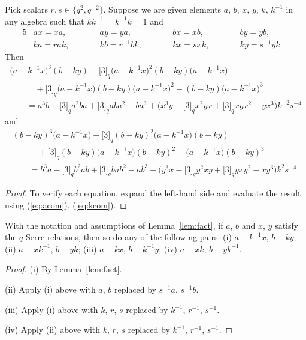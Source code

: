 \begin{Lemma}\label{lem:fact}
Pick scalars $r,s\in \big\lbrace q^2,q^{-2}\big\rbrace$. Suppose we are given elements $a$, $b$, $x$, $y$, $k$, $k^{-1}$ in any algebra such that $kk^{-1}= k^{-1}k=1$ and
\begin{alignat}{5}
& ax=xa, \qquad&&
ay=ya, \qquad&&
bx=xb, \qquad&&
by=yb,& \label{eq:acom}\\
&ka = rak, \qquad &&
kb = r^{-1} bk, \qquad&&
kx = s xk, \qquad&&
ky = s^{-1} yk.&
\label{eq:kcom}
\end{alignat}
Then
\begin{gather*}
\big(a-k^{-1}x\big)^3 (b-k y)- \lbrack 3 \rbrack_q \big(a-k^{-1}x\big)^2 (b-ky)\big(a-k^{-1}x\big)
\\
\qquad \quad{} + \lbrack 3 \rbrack_q \big(a-k^{-1}x\big) (b-ky)\big(a-k^{-1}x\big)^2 -
(b-ky)\big(a-k^{-1}x\big)^3 \\
\qquad{} = a^3 b - \lbrack 3 \rbrack_q a^2 b a + \lbrack 3 \rbrack_q a b a^2 -ba^3
 + \big(x^3 y -\lbrack 3 \rbrack_q x^2 yx+\lbrack 3 \rbrack_q xy x^2-yx^3\big) k^{-2} s^{-4}
\end{gather*}
and
\begin{gather*}
(b-ky)^3\big(a-k^{-1} x\big)- \lbrack 3 \rbrack_q (b-ky)^2 \big(a-k^{-1}x\big)(b-ky)\\
\qquad \quad {}+ \lbrack 3 \rbrack_q (b-ky) \big(a-k^{-1}x\big)(b-ky)^2 - \big(a-k^{-1}x\big)(b-ky)^3\\
\qquad{} = b^3 a -\lbrack 3 \rbrack_q b^2 a b+\lbrack 3 \rbrack_q b a b^2-ab^3
 + \big(y^3 x -\lbrack 3 \rbrack_q y^2 xy+\lbrack 3 \rbrack_q y x y^2-xy^3\big) k^2 s^{-4}.
\end{gather*}
\end{Lemma}
\begin{proof} To verify each equation, expand the left-hand side and evaluate the result using
(\ref{eq:acom}), (\ref{eq:kcom}).
\end{proof}

\begin{Corollary}\label{cor:aside}With the notation and assumptions of Lemma~{\rm \ref{lem:fact}}, if $a$, $b$ and $x$, $y$ satisfy the $q$-Serre relations, then so do any of the following pairs: {\rm (i)} $a-k^{-1}x$, $b-ky$;
{\rm (ii)} $a-xk^{-1}$, $b-yk$;
{\rm (iii)} $a-kx$, $b-k^{-1}y$;
{\rm (iv)} $a-xk$, $b-yk^{-1}$.
\end{Corollary}
\begin{proof} (i) By Lemma~\ref{lem:fact}.

(ii) Apply (i) above with $a$, $b$ replaced by $s^{-1}a$, $s^{-1}b$.

(iii) Apply (i) above with $k$, $r$, $s$ replaced by $k^{-1}$, $r^{-1}$, $s^{-1}$.

 (iv) Apply (ii) above with $k$, $r$, $s$ replaced by $k^{-1}$, $r^{-1}$, $s^{-1}$.
\end{proof}

